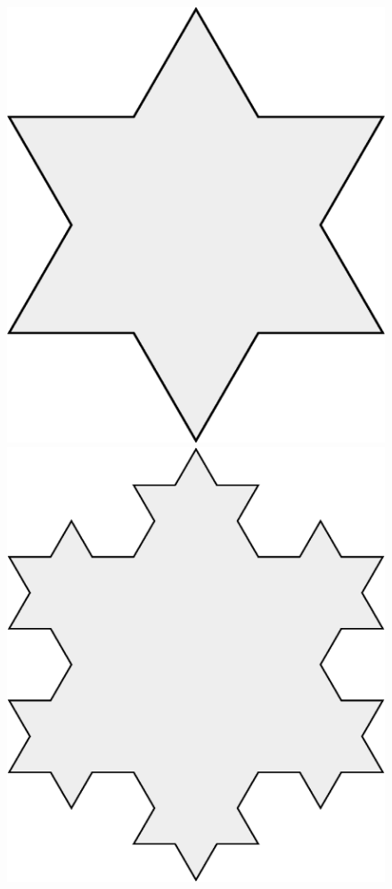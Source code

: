 \begin{figure}[h!]
\begin{minipage}{.24\textwidth}
\includegraphics[scale=.15]{pics/Koch_Snowflake-1}
\end{minipage}
\hfill
\begin{minipage}{.24\textwidth}
\centering
\includegraphics[scale=.15]{pics/Koch_Snowflake-2}

\end{minipage}
\end{figure}
